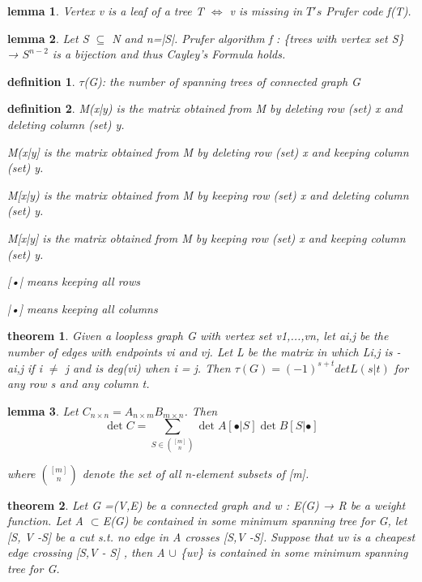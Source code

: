 \documentclass[twocolumn][2pt]{article}
\newtheorem{theorem}{theorem}[section]  %
\newtheorem{definition}{definition}
\newtheorem{lemma}{lemma}
\begin{document}
\begin{CJK*}{UTF8}{bkai}
    \begin{lemma}
        Vertex v is a leaf of a tree T $\iff$ v is missing in $T's$ Prufer code f(T).
    \end{lemma}

    \begin{lemma}
        Let S $\subseteq$ N and n=|S|. Prufer algorithm f : \{trees with vertex set S\} → $S^{n-2}$
 is a bijection and thus Cayley's Formula holds.
    \end{lemma}    

    \begin{definition}
         $\tau$(G): the number of spanning trees of connected graph G
    \end{definition}

    \begin{definition}
        M(x|y) is the matrix obtained from M by deleting row (set) x and deleting
 column (set) y.

 M(x|y] is the matrix obtained from M by deleting row (set) x and keeping
 column (set) y.

 M[x|y) is the matrix obtained from M by keeping row (set) x and deleting
 column (set) y.

 M[x|y] is the matrix obtained from M by keeping row (set) x and keeping
 column (set) y.

 [•| means keeping all rows
 
 |•] means keeping all columns
    \end{definition}


    \begin{theorem}
        Given a loopless graph G with vertex set v1,...,vn, let ai,j be the number of
 edges with endpoints vi and vj. Let L be the matrix in which Li,j is -ai,j if
 i $\neq$ j and is deg(vi) when i = j. Then
 $\tau(G) = (-1)^{s+t}detL(s|t)$
 for any row s and any column t.
    \end{theorem}

    \begin{lemma} 
        Let \( C_{n \times n} = A_{n \times m} B_{m \times n} \). Then
        \[
        \det C = \sum_{S \in \binom{[m]}{n}} \det A[\bullet |S] \det B[S| \bullet]
        \]

        where $\binom{[m]}{n}$ denote the set of all n-element subsets of [m].
    \end{lemma}

    \begin{theorem}
        Let G =(V,E) be a connected graph and w : E(G) → R be a weight function.
 Let A $\subset$E(G) be contained in some minimum spanning tree for G, let
 [S, V -S] be a cut s.t. no edge in A crosses [S,V -S]. Suppose that uv is a
 cheapest edge crossing [S,V - S] , then A $\cup$ \{uv\} is contained in some
 minimum spanning tree for G.
    \end{theorem}


\end{CJK*}
\end{document}
